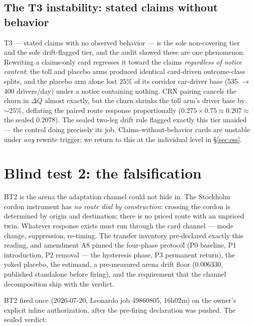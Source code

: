 \documentclass[11pt]{article}
\newcommand{\dq}{\Delta Q}
\begin{document}
\subsection{The T3 instability: stated claims without behavior}
\label{sec:t3}

T3 --- stated claims with no observed behavior --- is the sole
non-covering tier and the sole drift-flagged tier, and the audit showed
these are one phenomenon. Rewriting a claims-only card regresses it
toward the claims \emph{regardless of notice content}: the toll and
placebo arms produced identical card-driven outcome-class splits, and
the placebo arm alone lost $25\%$ of its corridor car-driver base
(535 $\to$ 400 drivers/day) under a notice containing nothing. CRN
pairing cancels the churn in $\dq$ almost exactly, but the churn
shrinks the toll arm's driver base by $\sim 25\%$, deflating the paired
route response proportionally ($0.275 \times 0.75 \approx 0.207
\approx$ the sealed $0.2078$). The sealed two-leg drift rule flagged
exactly this tier unaided --- the control doing precisely its job.
Claims-without-behavior cards are unstable under \emph{any} rewrite
trigger; we return to this at the individual level in \S\ref{sec:ess}.

\section{Blind test 2: the falsification}
\label{sec:bt2}

BT2 is the arena the adaptation channel could not hide in. The
Stockholm cordon instrument has \emph{no route dial by construction}:
crossing the cordon is determined by origin and destination; there is
no priced route with an unpriced twin. Whatever response exists must
run through the card channel --- mode change, suppression, re-timing.
The transfer inventory pre-declared exactly this reading, and amendment
A8 pinned the four-phase protocol (P0 baseline, P1 introduction, P2
removal --- the hysteresis phase, P3 permanent return), the yoked
placebo, the estimand, a pre-measured arena drift floor ($0.006330$,
published standalone before firing), and the requirement that the
channel decomposition ship with the verdict.

BT2 fired once (2026-07-20, Leonardo job 49860805, 16h02m) on the
owner's explicit inline authorization, after the pre-firing declaration
was pushed. The sealed verdict:
\end{document}
